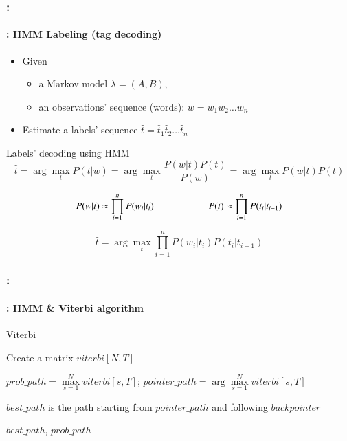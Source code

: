\documentclass[xcolor=table]{beamer}
\begin{document}
\begin{frame}
	\frametitle{\insertshortsubtitle: \insertsection}
	\framesubtitle{\insertsubsection: HMM Labeling (tag decoding)}
	
	\begin{itemize}
		\item Given
		\begin{itemize}
			\item a Markov model $\lambda = (A, B)$,
			\item an observations' sequence (words): $w = w_1 w_2 \ldots w_n$
		\end{itemize}
		\item Estimate a labels' sequence $\hat{t} = \hat{t}_1 \hat{t}_2 \ldots \hat{t}_n$
	\end{itemize}
	
	\begin{block}{Labels' decoding using HMM}
		\[
		\hat{t} = \arg\max\limits_t P(t | w) = \arg\max\limits_t \frac{P(w|t) P(t)}{P(w)} = \arg\max\limits_t P(w|t) P(t)%
		\]
		
		\[ 
		P(w | t) \approx \prod\limits_{i=1}^n P(w_i|t_i) 
		\hskip2cm
		P(t) \approx \prod\limits_{i=1}^n P(t_i|t_{i-1}) 
		\]
		
		\[
		\hat{t} = \arg\max\limits_t \prod\limits_{i=1}^n P(w_i|t_i) P(t_i|t_{i-1})
		\]
	\end{block}
\end{frame}

\begin{frame}
	\frametitle{\insertshortsubtitle: \insertsection}
	\framesubtitle{\insertsubsection: HMM \& Viterbi algorithm}
	
	\begin{block}{Viterbi}
		\scriptsize
		\begin{algorithm}[H]
			
			Create a matrix $viterbi[N, T]$\;
			
			
			
			$prob\_path = \max\limits_{s=1}^N viterbi[s, T];\, pointer\_path = \arg\max\limits_{s=1}^N viterbi[s, T]$\;
			
			$best\_path$ is the path starting from $pointer\_path$ and following $backpointer$
			
			\Return $best\_path$, $prob\_path$\;
			
		\end{algorithm}
	\end{block}
	
\end{frame}
\end{document}
